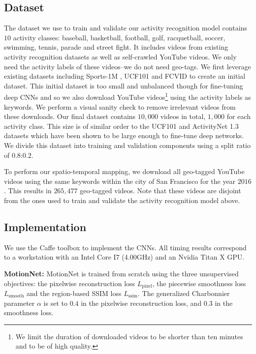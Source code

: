 \documentclass[sigconf]{acmart}
\begin{document}
	\subsection{Dataset}
	\label{sec:dataset}
	The dataset we use to train and validate our activity recognition model contains $10$ activity classes: baseball, basketball, football, golf, racquetball, soccer, swimming, tennis, parade and street fight. It includes videos from existing activity recognition datasets as well as self-crawled YouTube videos. We only need the activity labels of these videos--we do not need geo-tags. We first leverage existing datasets including Sports-1M \cite{KarpathyCVPR14}, UCF101 \cite{ucf101} and FCVID \cite{FCVID} to create an initial dataset. This initial dataset is too small and unbalanced though for fine-tuning deep CNNs and so we also download YouTube videos\footnote{We limit the duration of downloaded videos to be shorter than ten minutes and to be of high quality.} using the activity labels as keywords. We perform a visual sanity check to remove irrelevant videos from these downloads. Our final dataset contains $10,000$ videos in total, $1,000$ for each activity class. This size is of similar order to the UCF101 \cite{ucf101} and ActivityNet 1.3 \cite{activityNet} datasets which have been shown to be large enough to fine-tune deep networks. We divide this dataset into training and validation components using a split ratio of $0.8$:$0.2$.
	
	To perform our spatio-temporal mapping, we download all geo-tagged YouTube videos using the same keywords within the city of San Francisco for the year $2016$. This results in $265,477$ geo-tagged videos. Note that these videos are disjoint from the ones used to train and validate the activity recognition model above. 
	
	\subsection{Implementation}
	\label{sec:implementation}
	We use the Caffe toolbox \cite{jia2014caffe} to implement the CNNs. All timing results correspond to a workstation with an Intel Core I7 (4.00GHz) and an Nvidia Titan X GPU. 
	
	\noindent \textbf{MotionNet:} 
	MotionNet is trained from scratch using the three unsupervised objectives: the pixelwise reconstruction loss $L_{\text{pixel}}$, the piecewise smoothness loss $L_{\text{smooth}}$ and the region-based SSIM loss $L_{\text{ssim}}$. The generalized Charbonnier parameter $\alpha$ is set to $0.4$ in the pixelwise reconstruction loss, and $0.3$ in the smoothness loss. 
	
\end{document}
